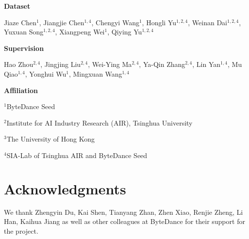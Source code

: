 \textbf{Dataset}

Jiaze Chen$^{1}$, Jiangjie Chen$^{1,4}$, Chengyi Wang$^{1}$, Hongli Yu$^{1,2,4}$, Weinan Dai$^{1,2,4}$, Yuxuan Song$^{1,2,4}$, Xiangpeng Wei$^{1}$, Qiying Yu$^{1,2,4}$


\textbf{Supervision}

Hao Zhou$^{2,4}$, Jingjing Liu$^{2,4}$, Wei-Ying Ma$^{2,4}$, Ya-Qin Zhang$^{2,4}$, Lin Yan$^{1,4}$, Mu Qiao$^{1,4}$, Yonghui Wu$^{1}$, Mingxuan Wang$^{1,4}$


\textbf{Affiliation}





$^1$ByteDance Seed

$^2$Institute for AI Industry Research (AIR), Tsinghua University

$^3$The University of Hong Kong

$^4$SIA-Lab of Tsinghua AIR and ByteDance Seed

\section*{Acknowledgments}

We thank Zhengyin Du, Kai Shen, Tianyang Zhan, Zhen Xiao, Renjie Zheng, Li Han, Kaihua Jiang as well as other colleagues at ByteDance for their support for the \method project.